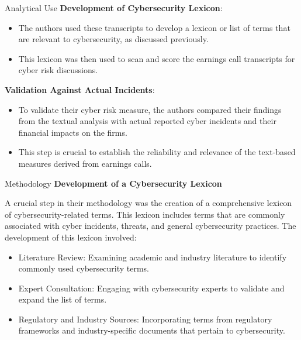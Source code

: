 \documentclass[11pt]{beamer}
\begin{document}
\begin{frame}{Analytical Use}
\textbf{Development of Cybersecurity Lexicon}: 

	\begin{itemize}
		\item The authors used these transcripts to develop a lexicon or list of terms that are relevant to cybersecurity, as discussed previously. 

		\item This lexicon was then used to scan and score the earnings call transcripts for cyber risk discussions.

	\end{itemize}
\textbf{Validation Against Actual Incidents}: 

	\begin{itemize}
		\item To validate their cyber risk measure, the authors compared their findings from the textual analysis with actual reported cyber incidents and their financial impacts on the firms. 

		\item This step is crucial to establish the reliability and relevance of the text-based measures derived from earnings calls.

	\end{itemize}
\end{frame}
\begin{frame}{Methodology}
\textbf{Development of a Cybersecurity Lexicon}

A crucial step in their methodology was the creation of a comprehensive lexicon of cybersecurity-related terms. This lexicon includes terms that are commonly associated with cyber incidents, threats, and general cybersecurity practices. The development of this lexicon involved:

	\begin{itemize}
		\item Literature Review: Examining academic and industry literature to identify commonly used cybersecurity terms.

		\item Expert Consultation: Engaging with cybersecurity experts to validate and expand the list of terms.

		\item Regulatory and Industry Sources: Incorporating terms from regulatory frameworks and industry-specific documents that pertain to cybersecurity.

	\end{itemize}
\end{frame}
\end{document}
